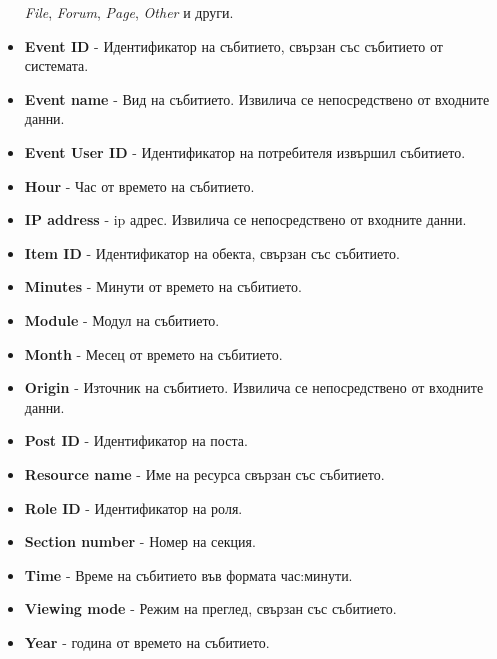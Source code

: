\documentclass[a4paper, 12pt]{article}
\begin{document}
\begin{itemize}
\textit{File}, \textit{Forum}, \textit{Page}, \textit{Other} и други.
\item \textbf{Event ID} - Идентификатор на събитието, свързан със събитието от системата.
\item \textbf{Event name} - Вид на събитието. Извилича се непосредствено от входните данни.
\item \textbf{Event User ID} - Идентификатор на потребителя извършил събитието.
\item \textbf{Hour} - Час от времето на събитието.
\item \textbf{IP address} - ip адрес. Извилича се непосредствено от входните данни.
\item \textbf{Item ID} - Идентификатор на обекта, свързан със събитието.
\item \textbf{Minutes} - Минути от времето на събитието.
\item \textbf{Module} - Модул на събитието.
\item \textbf{Month} - Месец от времето на събитието.
\item \textbf{Origin} - Източник на събитието. Извилича се непосредствено от входните данни.
\item \textbf{Post ID} - Идентификатор на поста.
\item \textbf{Resource name} - Име на ресурса свързан със събитието.
\item \textbf{Role ID} - Идентификатор на роля.
\item \textbf{Section number} - Номер на секция.
\item \textbf{Time} - Време на събитието във формата час:минути.
\item \textbf{Viewing mode} - Режим на преглед, свързан със събитието.
\item \textbf{Year} - година от времето на събитието.
\end{itemize}
\end{document}
